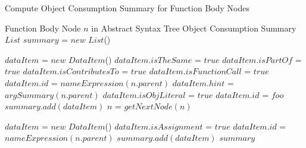 \documentclass[10pt, preprint]{sigplanconf}
\begin{document}
\begin{algorithm}                      %
\caption{Compute Object Consumption Summary for Function Body Nodes}          %
\label{alg1}                           %
\begin{algorithmic}                    %
\REQUIRE Function Body Node $n$ in Abstract Syntax Tree
\ENSURE Object Consumption Summary 
\STATE $List$ $summary$ = $new$ $List$()


	\STATE $dataItem$ = $new$ $DataItem$()
    	 \STATE $dataItem.isTheSame$ = $true$
    		\STATE $dataItem.isPartOf$ = $true$
    \ELSE	
	   		\STATE $dataItem.isContributesTo$ = $true$
    \ENDIF
   	    \STATE $dataItem.isFunctionCall$ = $true$
   	    \STATE $dataItem.id$ = $nameExpression(n.parent)$
   	    \STATE $dataItem.hint$ = $argSummary(n.parent)$
   	    \STATE $dataItem.isObjLiteral$ = $true$
   	    \STATE $dataItem.id$ = $foo$
    \ENDIF     
   \STATE $summary.add(dataItem)$
   \STATE $n$ = $getNextNode(n)$
\ENDWHILE 
 
  	\STATE $dataItem$ = $new$ $DataItem$()
		\STATE $dataItem.isAssignment$ = $true$
    \STATE $dataItem.id$ = $nameExpression(n.parent)$
    \STATE $summary.add(dataItem)$
  \ENDIF	
  \RETURN $summary$
\end{algorithmic}
\end{algorithm}
\end{document}
